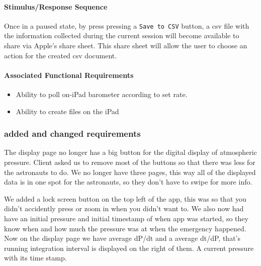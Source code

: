 \documentclass[onecolumn, draftclsnofoot,10pt, compsoc]{IEEEtran}
\begin{document}
\paragraph{Stimulus/Response Sequence}
Once in a paused state, by press pressing a \lstinline|Save to CSV| button, a csv file with the information collected during the current session will become available to share via Apple's share sheet.
This share sheet will allow the user to choose an action for the created csv document.
\paragraph{Associated Functional Requirements}
\begin{itemize}
\item Ability to poll on-iPad barometer according to set rate.
\item Ability to create files on the iPad
\end{itemize}


\subsubsection{added and changed requirements}
The display page no longer has a big button for the digital display of atmospheric pressure.
Client asked us to remove most of the buttons so that there was less for the astronauts to do.
We no longer have three pages, this way all of the displayed data is in one spot for the astronauts, so they don't have to swipe for more info.

We added a lock screen button on the top left of the app, this was so that you didn't accidently press or zoom in when you didn't want to.
We also now had have an initial pressure and initial timestamp of when app was started, so they know when and how much the pressure was at when the emergency happened.
Now on the display page we have average dP/dt and a average dt/dP, that's running integration interval is displayed on the right of them.
A current pressure with its time stamp.


\end{document}
